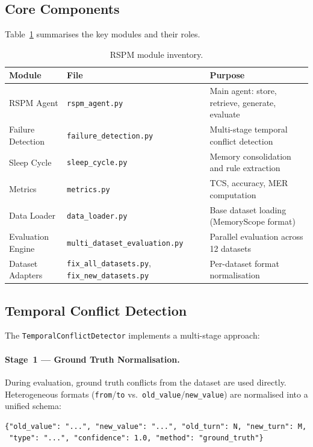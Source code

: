 \documentclass[11pt,a4paper]{article}
\begin{document}
\subsection{Core Components}

Table~\ref{tab:components} summarises the key modules and their roles.

\begin{table}[H]
\centering
\caption{RSPM module inventory.}
\label{tab:components}
\small
\begin{tabularx}{\textwidth}{llX}
\toprule
\textbf{Module} & \textbf{File} & \textbf{Purpose} \\
\midrule
RSPM Agent         & \texttt{rspm\_agent.py}                & Main agent: store, retrieve, generate, evaluate \\
Failure Detection  & \texttt{failure\_detection.py}          & Multi-stage temporal conflict detection \\
Sleep Cycle        & \texttt{sleep\_cycle.py}                & Memory consolidation and rule extraction \\
Metrics            & \texttt{metrics.py}                     & TCS, accuracy, MER computation \\
Data Loader        & \texttt{data\_loader.py}                & Base dataset loading (MemoryScope format) \\
Evaluation Engine  & \texttt{multi\_dataset\_evaluation.py}  & Parallel evaluation across 12 datasets \\
Dataset Adapters   & \texttt{fix\_all\_datasets.py}, \texttt{fix\_new\_datasets.py} & Per-dataset format normalisation \\
\bottomrule
\end{tabularx}
\end{table}


\subsection{Temporal Conflict Detection}
\label{sec:conflict}

The \texttt{TemporalConflictDetector} implements a multi-stage approach:

\paragraph{Stage~1 --- Ground Truth Normalisation.}
During evaluation, ground truth conflicts from the dataset are used directly.
Heterogeneous formats (\texttt{from}/\texttt{to} vs.\ \texttt{old\_value}/\texttt{new\_value})
are normalised into a unified schema:
\begin{lstlisting}
{"old_value": "...", "new_value": "...", "old_turn": N, "new_turn": M,
 "type": "...", "confidence": 1.0, "method": "ground_truth"}
\end{lstlisting}
\end{document}

